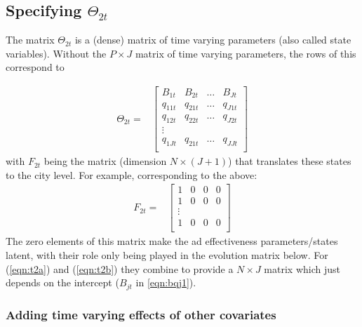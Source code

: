 \documentclass[letter,10pt]{article}
\begin{document}
\subsection{Specifying $\Theta_{2t}$}

The matrix $\Theta_{2t}$ is a (dense)  matrix of time varying parameters 
(also called state variables).  Without the $P\times J$ matrix of time varying parameters, the rows of this correspond to 

\begin{equation}
\begin{array}{ll}
      \Theta_{2t} = & \left[\begin{array}{cccl}
		 B_{1t} & B_{2t} &\ldots & B_{Jt} \\
		q_{11t} & q_{21t} & \ldots & q_{J1t} \\
		q_{12t} & q_{22t} & \ldots & q_{J2t} \\
	\vdots\\
		q_{1Jt} & q_{21t} & \ldots & q_{JJt} \\

		\end{array}\right]
\end{array}
\label{eqn:t2a}
\end{equation} 
with $F_{2t}$ being the matrix (dimension $N \times (J+1)$) that translates these states to the city level.  For example, corresponding
to the above:
\begin{equation}
\begin{array}{ll}
      F_{2t} = & \left[\begin{array}{cccl}
		1 & 0 & 0 & 0\\
		1 & 0 & 0 & 0\\
\vdots\\
		1 & 0 & 0 & 0\\
		\end{array}\right]
\end{array}
\label{eqn:t2b}
\end{equation} 
The zero elements of this matrix make the ad effectiveness parameters/states latent, with their
role only being played in the evolution matrix below.   For (\ref{eqn:t2a}) and (\ref{eqn:t2b}) they combine
to provide a $N\times J$ matrix which just depends on the intercept ($B_{jt}$ in \ref{eqn:bqj1}).  

\subsubsection{Adding time varying effects of other covariates}
\end{document}
